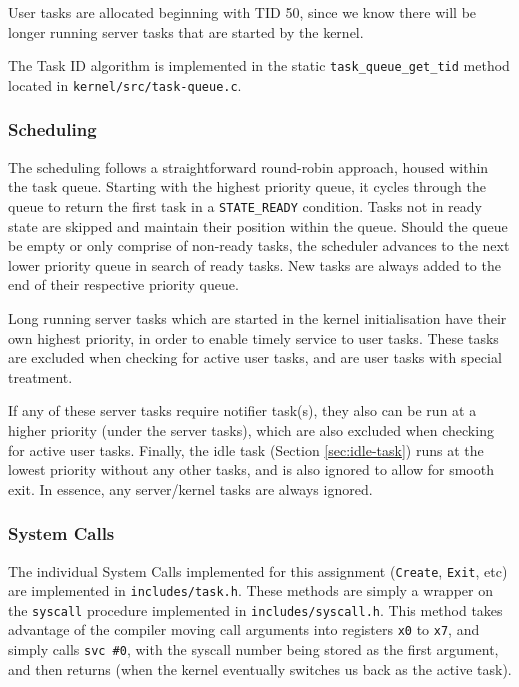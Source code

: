 \documentclass[12pt, titlepage]{article}
\begin{document}
    User tasks are allocated beginning with TID 50, since we know there will be longer running server tasks that are started by the kernel.

    The Task ID algorithm is implemented in the static \verb`task_queue_get_tid` method located in \verb`kernel/src/task-queue.c`.

    \subsubsection{Scheduling}
    \label{sec:scheduling}

    The scheduling follows a straightforward round-robin approach, housed within the task queue.
    Starting with the highest priority queue, it cycles through the queue to return the first task in a \verb`STATE_READY` condition.
    Tasks not in ready state are skipped and maintain their position within the queue.
    Should the queue be empty or only comprise of non-ready tasks, the scheduler advances to the next lower priority queue in search of ready tasks.
    New tasks are always added to the end of their respective priority queue.

    Long running server tasks which are started in the kernel initialisation have their own highest priority, in order to enable timely service to user tasks. These tasks are excluded when checking for active user tasks, and are user tasks with special treatment. 
    
    If any of these server tasks require notifier task(s), they also can be run at a higher priority (under the server tasks), which are also excluded when checking for active user tasks. Finally, the idle task (Section \ref{sec:idle-task}) runs at the lowest priority without any other tasks, and is also ignored to allow for smooth exit. In essence, any server/kernel tasks are always ignored.

    \subsubsection{System Calls}
    \label{sec:sys-calls}

    The individual System Calls implemented for this assignment (\verb`Create`, \verb`Exit`, etc) are implemented in \verb`includes/task.h`. These methods are simply a wrapper on the \verb`syscall` procedure implemented in \verb`includes/syscall.h`. This method takes advantage of the compiler moving call arguments into registers \verb`x0` to \verb`x7`, and simply calls \verb`svc #0`, with the syscall number being stored as the first argument, and then returns (when the kernel eventually switches us back as the active task).
\end{document}
